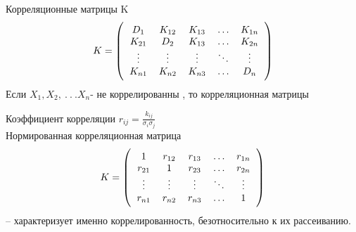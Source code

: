 \documentclass[russian, 12pt, fleqn]{article}
\begin{document}
Корреляционные матрицы K
$$
K=\left(\begin{tabular}{c c c c c}
\(D_1\) & \(K_{12}\) & \(K_{13}\) & \(\ldots\) & \(K_{1n}\) \\
\(K_{21}\) &\( D_2\) & \(K_{13}\) & \(\ldots\) &\( K_{2n}\)\\
\(\vdots\) & \(\vdots\) & \(\vdots\) & \(\ddots\) & \(\vdots\) \\
\(K_{n1}\)& \(K_{n2}\) &\( K_{n3}\) & \(\ldots\) & \(D_n\)\\
\end{tabular}\right)$$
Если $X_1, X_2, \ .\ .\ . X_n$- не коррелированны , то корреляционная матрицы 



Коэффициент корреляции $r_{ij} = \frac{k_{ij}}{\sigma_i \sigma_j}$\\
Нормированная корреляционная матрица
$$
K=\left(\begin{tabular}{c c c c c}
\(1\) & \(r_{12}\) & \(r_{13}\) & \(\ldots\) & \(r_{1n}\) \\
\(r_{21}\) &\(1\) & \(r_{23}\) & \(\ldots\) &\( r_{2n}\)\\
\(\vdots\) & \(\vdots\) & \(\vdots\) & \(\ddots\) & \(\vdots\) \\
\(r_{n1}\)& \(r_{n2}\) &\( r_{n3}\) & \(\ldots\) & \(1\)\\
\end{tabular}\right)$$
-- характеризует именно коррелированность, безотносительно  к их рассеиванию.



\end{document}
